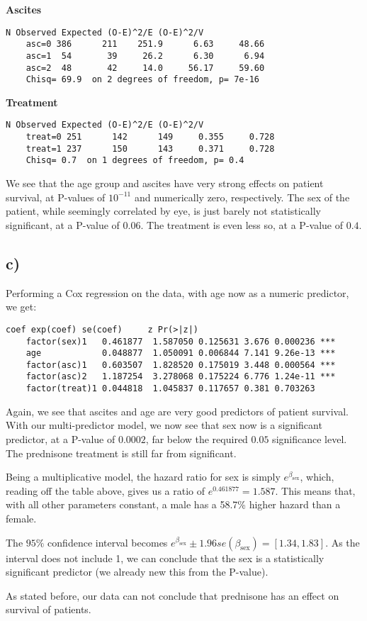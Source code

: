 \documentclass[a4paper, twocolumn]{article}
\renewcommand{\exp}{e^}
\begin{document}
\textbf{Ascites}
\begin{Verbatim}[fontsize=\scriptsize]
            N Observed Expected (O-E)^2/E (O-E)^2/V
    asc=0 386      211    251.9      6.63     48.66
    asc=1  54       39     26.2      6.30      6.94
    asc=2  48       42     14.0     56.17     59.60
    Chisq= 69.9  on 2 degrees of freedom, p= 7e-16 
\end{Verbatim}

\textbf{Treatment}
\begin{Verbatim}[fontsize=\scriptsize]
            N Observed Expected (O-E)^2/E (O-E)^2/V
    treat=0 251      142      149     0.355     0.728
    treat=1 237      150      143     0.371     0.728
    Chisq= 0.7  on 1 degrees of freedom, p= 0.4
\end{Verbatim}

We see that the age group and ascites have very strong effects on patient survival, at P-values of $10^{-11}$ and numerically zero, respectively. The sex of the patient, while seemingly correlated by eye, is just barely not statistically significant, at a P-value of $0.06$. The treatment is even less so, at a P-value of $0.4$.


\subsection*{c)}
Performing a Cox regression on the data, with age now as a numeric predictor, we get:
\begin{Verbatim}[fontsize=\scriptsize]
                    coef exp(coef) se(coef)     z Pr(>|z|)    
    factor(sex)1   0.461877  1.587050 0.125631 3.676 0.000236 ***
    age            0.048877  1.050091 0.006844 7.141 9.26e-13 ***
    factor(asc)1   0.603507  1.828520 0.175019 3.448 0.000564 ***
    factor(asc)2   1.187254  3.278068 0.175224 6.776 1.24e-11 ***
    factor(treat)1 0.044818  1.045837 0.117657 0.381 0.703263    
\end{Verbatim}

Again, we see that ascites and age are very good predictors of patient survival. With our multi-predictor model, we now see that sex now is a significant predictor, at a P-value of $0.0002$, far below the required $0.05$ significance level. The prednisone treatment is still far from significant.

Being a multiplicative model, the hazard ratio for sex is simply $\exp{\beta_\mathrm{sex}}$, which, reading off the table above, gives us a ratio of $\exp{0.461877} = 1.587$. This means that, with all other parameters constant, a male has a 58.7\% higher hazard than a female.

The $95\%$ confidence interval becomes $\exp{\beta_\mathrm{sex}} \pm 1.96 se(\beta_\mathrm{sex}) = [1.34, 1.83]$. As the interval does not include 1, we can conclude that the sex is a statistically significant predictor (we already new this from the P-value).

As stated before, our data can not conclude that prednisone has an effect on survival of patients.
\end{document}
